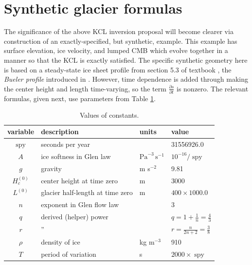 \documentclass[letterpaper,final,12pt,reqno]{amsart}
\newcommand{\spy}{\operatorname{spy}}
\begin{document}
\section{Synthetic glacier formulas}

The significance of the above KCL inversion proposal will become clearer via construction of an exactly-specified, but synthetic, example.  This example has surface elevation, ice velocity, and lumped CMB which evolve together in a manner so that the KCL is exactly satisfied.  The specific synthetic geometry here is based on a steady-state ice sheet profile from section 5.3 of textbook \cite{vanderVeen2013}, the \emph{Bueler profile} introduced in \cite{Bueler2003}.  However, time dependence is added through making the center height and length time-varying, so the term $\frac{\partial s}{\partial t}$ is nonzero.  The relevant formulas, given next, use parameters from Table \ref{constantstable}.

\begin{table}
\begin{tabular}{clll}
variable  & description & units & value \\
\hline
$\spy$ & seconds per year &  & 31556926.0 \\
$A$ & ice softness in Glen law & $\text{Pa}^{-3}\,\text{s}^{-1}$ & $10^{-16}/\spy$ \\
$g$ & gravity & m s$^{-2}$ & 9.81 \\
$H_c^{(0)}$ & center height at time zero & m & 3000 \\
$L^{(0)}$ & glacier half-length at time zero & m & $400 \times 1000.0$ \\
$n$ & exponent in Glen flow law & & 3 \\
$q$ & derived (helper) power & & $q = 1+\frac{1}{n} = \frac{4}{3}$ \\
$r$ & \qquad '' & & $r = \frac{n}{2n+2} = \frac{3}{8}$ \\
$\rho$ & density of ice & kg m$^{-3}$ & 910 \\
$T$ & period of variation & s & $2000 \times \spy$
\end{tabular}
\bigskip
\caption{Values of constants.}
\label{constantstable}
\end{table}
\end{document}

